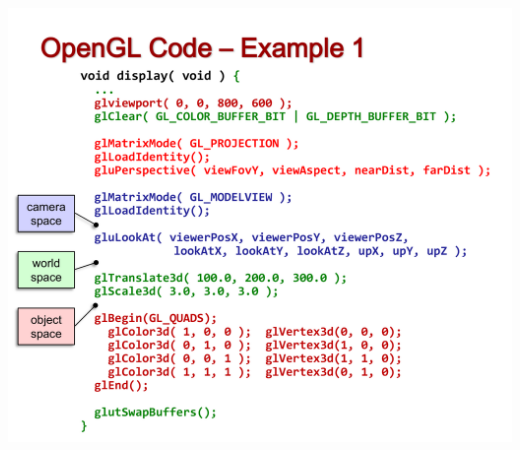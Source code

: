 \documentclass{beamer}
\begin{document}
\begin{frame}
    \centering
    \includegraphics[scale=0.4]{pg48.png}
\end{frame}

\end{document}

